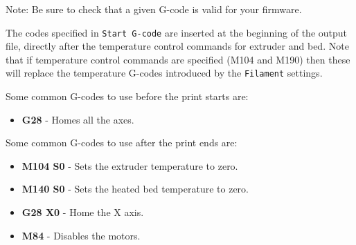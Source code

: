 Note: Be sure to check that a given G-code is valid for your firmware.

The codes specified in \texttt{Start G-code} are inserted at the beginning of the output file, directly after the temperature control commands for extruder and bed.  Note that if temperature control commands are specified (M104 and M190) then these will replace the temperature G-codes introduced by the \texttt{Filament} settings.

Some common G-codes to use before the print starts are:
\begin{itemize}
	\item \textbf{G28}  - Homes all the axes.
\end{itemize}


Some common G-codes to use after the print ends are:
\begin{itemize}
	\item \textbf{M104 S0}  - Sets the extruder temperature to zero.
	\item \textbf{M140 S0} - Sets the heated bed temperature to zero.
	\item \textbf{G28 X0} - Home the X axis.
	\item \textbf{M84}  - Disables the motors.
\end{itemize}

